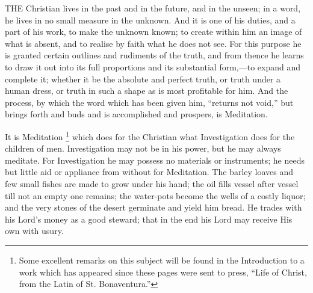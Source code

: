 

THE
Christian lives in the past and in the future, and in the unseen; in a
word, he lives in no small measure in the unknown. And it is one of
his duties, and a part of his work, to make the unknown known; to
create within him an image of what is absent, and to realise by faith
what he does not see. For this purpose he is granted certain outlines
and rudiments of the truth, and from thence he learns to draw it out
into its full proportions and its substantial form,—to expand and
complete it; whether it be the absolute and perfect truth, or truth
under a human dress, or truth in such a shape as is most profitable
for him. And the process, by which the word which has been given him, ``returns
not void,'' but brings forth and buds and is accomplished and prospers,
is Meditation.

It is Meditation \footnote{Some excellent remarks on this subject will be
found in the Introduction to a work which has appeared since these
pages were sent to press, ``Life of Christ, from the Latin of St.
Bonaventura.''}
which does for the Christian what Investigation does for the children
of men. Investigation may not be in his power, but he may always
meditate. For Investigation he may possess no materials or
instruments; he needs but little aid or appliance from without for
Meditation. The barley loaves and few small fishes are made to grow
under his hand; the oil fills vessel after vessel till not an empty
one remains; the water-pots become the wells of a costly liquor; and
the very stones of the desert germinate and yield him bread. He trades
with his Lord's money as a good steward; that in the end his Lord may
receive His own with usury.

